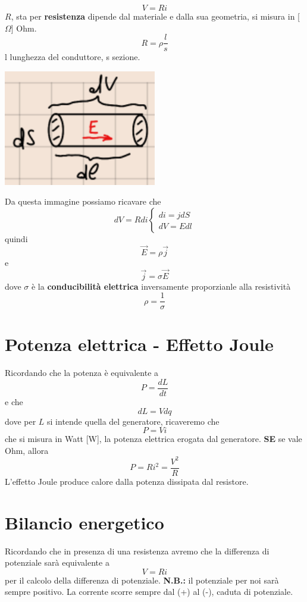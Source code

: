\documentclass[a4paper, 12pt]{book}
\theoremstyle{plain}
\begin{document}
\[
    V = Ri
\]
$R$, sta per \textbf{resistenza} dipende dal materiale
 e dalla sua geometria, si misura in [$\Omega$] Ohm.
\[
    R = \rho \frac{l}{s}
\]
l lunghezza del conduttore, s sezione.
\begin{center}
    \includegraphics[width=0.5\textwidth]{ohm.png}
\end{center}
Da questa immagine possiamo ricavare che 
\[
    dV = Rdi \begin{cases}
        di = jdS \\
        dV = Edl
    \end{cases}
\]
quindi 
\[
    \vec{E} = \rho \vec{j}
\]
e 
\[
    \vec{j} = \sigma \vec{E}
\]
dove $\sigma$ è la \textbf{conducibilità elettrica}
inversamente proporzianle alla resistività
\[
    \rho = \frac{1}{\sigma}
\]

\section{Potenza elettrica - Effetto Joule}

Ricordando che la potenza è equivalente a 
\[
    P = \frac{dL}{dt}
\]
e che 
\[
    dL = Vdq
\]
dove per $L$ si intende quella del generatore, ricaveremo 
che 
\[
    P = Vi
\]
che si misura in Watt [W], la potenza elettrica erogata
dal generatore. \textbf{SE} se vale Ohm, allora 
\[
    P = Ri^2 = \frac{V^2}{R}
\]
L'effetto Joule produce calore dalla potenza dissipata 
dal resistore.

\section{Bilancio energetico}

Ricordando che in presenza di una resistenza avremo 
che la differenza di potenziale sarà equivalente a 
\[ V = Ri \] per il calcolo della differenza di potenziale.
\textbf{N.B.:} il potenziale per noi sarà sempre positivo.
La corrente scorre sempre dal (+) al (-), caduta di 
potenziale.
\end{document}
